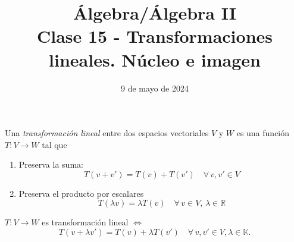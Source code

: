 \documentclass[handout]{beamer} %
\title[Clase 15 - Transformaciones lineales. Núcleo e imagen]{Álgebra/Álgebra II \\Clase 15 - Transformaciones lineales. Núcleo e imagen}
\author[]{}
\institute[]{\normalsize FAMAF / UNC
	\\[\baselineskip] ${}^{}$
	\\[\baselineskip]
}
\date[09/05/2024]{9 de mayo de 2024}
\newcommand{\R}{\mathbb R}
\newcommand{\K}{\mathbb K}
\begin{document}
\begin{frame}
\maketitle
\end{frame}

\begin{frame}
    \begin{definicion}
    Una \textit{transformación lineal} entre dos espacios vectoriales $V$ y $W$ es una función $T:V\longrightarrow W$ tal que \pause
    \begin{enumerate}
     \item Preserva la suma: 
     $$
     T(v+v')=T(v)+T(v')
     \quad\forall\,v,v'\in V
     $$\pause
     \item Preserva el producto por escalares
     $$
     T(\lambda v)=\lambda T(v)
     \quad\forall\,v\in V,\,\lambda\in\R
     $$ 
    \end{enumerate}
    
    \end{definicion}
    \pause
    \begin{observacion}
        $T:V\longrightarrow W$  es transformación lineal  $\Leftrightarrow$ 
        $$
        T(v+\lambda v')=T(v)+\lambda T(v')\quad\forall\,v,v'\in V, \lambda \in \K.
        $$
    
    \end{observacion}
    
\end{frame}

\end{document}
